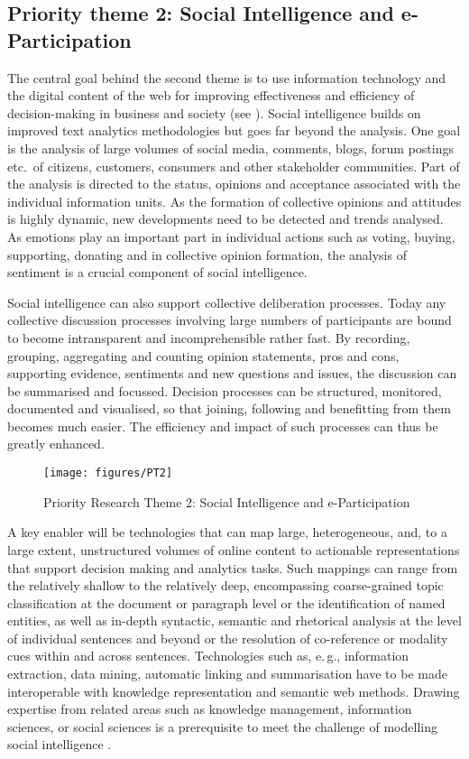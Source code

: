 \documentclass[output=paper]{LSP/langsci}
\begin{document}
\subsection{Priority theme 2: Social Intelligence and e-Participation}
\label{sec:priority-theme-2-social-intelligence}

The central goal behind the second theme is to use information
technology and the digital content of the web for improving
effectiveness and efficiency of deci\-sion-making in business and
society (see ). Social intelligence
builds on improved text analytics methodologies but goes far beyond
the analysis. One goal is the analysis of large volumes of social
media, comments, blogs, forum postings etc.~of citizens, customers,
consumers and other stakeholder communities. Part of the analysis is
directed to the status, opinions and acceptance associated with the
individual information units. As the formation of collective opinions
and attitudes is highly dynamic, new developments need to be detected
and trends analysed. As emotions play an important part in individual
actions such as voting, buying, supporting, donating and in collective
opinion formation, the analysis of sentiment is a crucial component of
social intelligence.
 
Social intelligence can also support collective deliberation
processes. Today any collective discussion processes involving large
numbers of participants are bound to become intransparent and
incomprehensible rather fast. By recording, grouping, aggregating and
counting opinion statements, pros and cons, supporting evidence,
sentiments and new questions and issues, the discussion can be
summarised and focussed. Decision processes can be structured,
monitored, documented and visualised, so that joining, following and
benefitting from them becomes much easier. The efficiency and impact
of such processes can thus be greatly enhanced.
 
\begin{figure*}[htb]
  \center
  \texttt{[image: figures/PT2]}
  \caption{Priority Research Theme 2: Social Intelligence and e-Participation}
  \label{fig:pt2-overview}
\end{figure*}

A key enabler will be technologies that can map large, heterogeneous,
and, to a large extent, unstructured volumes of online content to
actionable representations that support decision making and analytics
tasks. Such mappings can range from the relatively shallow to the
relatively deep, encompassing coarse-grained topic classification at
the document or paragraph level or the identification of named
entities, as well as in-depth syntactic, semantic and rhetorical
analysis at the level of individual sentences and beyond or the
resolution of co-reference or modality cues within and across
sentences. Technologies such as, e.\,g., information extraction, data
mining, automatic linking and summarisation have to be made
interoperable with knowledge representation and semantic web
methods. Drawing expertise from related areas such as knowledge
management, information sciences, or social sciences is a prerequisite
to meet the challenge of modelling social intelligence
\citep{ltds2012}.
\end{document}
